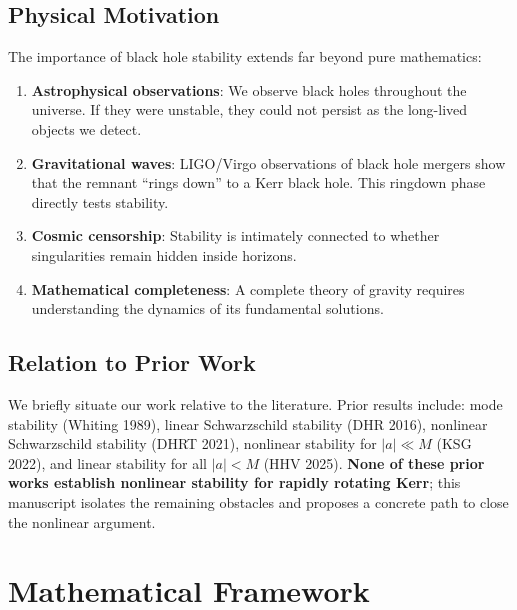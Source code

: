 \documentclass[12pt,a4paper]{article}
\begin{document}
\subsection{Physical Motivation}

The importance of black hole stability extends far beyond pure mathematics:

\begin{enumerate}
    \item \textbf{Astrophysical observations}: We observe black holes throughout the universe. If they were unstable, they could not persist as the long-lived objects we detect.
    
    \item \textbf{Gravitational waves}: LIGO/Virgo observations of black hole mergers show that the remnant ``rings down'' to a Kerr black hole. This ringdown phase directly tests stability.
    
    \item \textbf{Cosmic censorship}: Stability is intimately connected to whether singularities remain hidden inside horizons.
    
    \item \textbf{Mathematical completeness}: A complete theory of gravity requires understanding the dynamics of its fundamental solutions.
\end{enumerate}

\subsection{Relation to Prior Work}

We briefly situate our work relative to the literature. Prior results include: mode stability (Whiting 1989), linear Schwarzschild stability (DHR 2016), nonlinear Schwarzschild stability (DHRT 2021), nonlinear stability for $|a| \ll M$ (KSG 2022), and linear stability for all $|a| < M$ (HHV 2025). \textbf{None of these prior works establish nonlinear stability for rapidly rotating Kerr}; this manuscript isolates the remaining obstacles and proposes a concrete path to close the nonlinear argument.

\section{Mathematical Framework}
\end{document}
